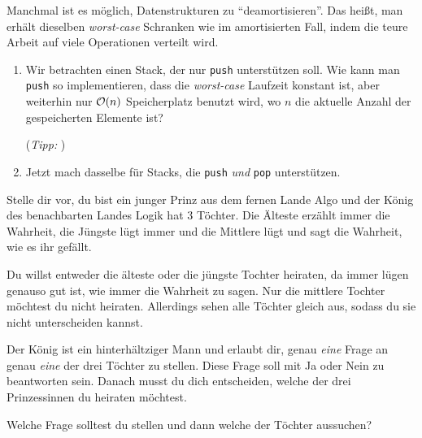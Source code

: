 \documentclass{uebung_cs}
\begin{document}
\begin{exercise}
    Manchmal ist es möglich, Datenstrukturen zu \enquote{deamortisieren}. Das heißt, man erhält dieselben \emph{worst-case} Schranken wie im amortisierten Fall, indem die teure Arbeit auf viele Operationen verteilt wird.

    \begin{enumerate}
        \item
        Wir betrachten einen Stack, der nur \texttt{push} unterstützen soll.
        Wie kann man \texttt{push} so implementieren, dass die \emph{worst-case} Laufzeit konstant ist, aber weiterhin nur $\mathcal{O}(n)$ Speicherplatz benutzt wird, wo $n$ die aktuelle Anzahl der gespeicherten Elemente ist?

        (\emph{Tipp: })

        \item Jetzt mach dasselbe für Stacks, die \texttt{push} \emph{und} \texttt{pop} unterstützen.
    \end{enumerate}
\end{exercise}

\begin{exercise}
    Stelle dir vor, du bist ein junger Prinz aus dem fernen Lande Algo und der König des benachbarten Landes Logik hat 3 Töchter. Die Älteste erzählt immer die Wahrheit, die Jüngste lügt immer und die Mittlere lügt und sagt die Wahrheit, wie es ihr gefällt.

    Du willst entweder die älteste oder die jüngste Tochter heiraten, da immer lügen genauso gut ist, wie immer die Wahrheit zu sagen. Nur die mittlere Tochter möchtest du nicht heiraten. Allerdings sehen alle Töchter gleich aus, sodass du sie nicht unterscheiden kannst.

    Der König ist ein hinterhältziger Mann und erlaubt dir, genau \textit{eine} Frage an genau \textit{eine} der drei Töchter zu stellen. Diese Frage soll mit \glqq Ja\grqq{} oder \glqq Nein\grqq{} zu beantworten sein. Danach musst du dich entscheiden, welche der drei Prinzessinnen du heiraten möchtest.

    Welche Frage solltest du stellen und dann welche der Töchter aussuchen?
\end{exercise}
\end{document}
